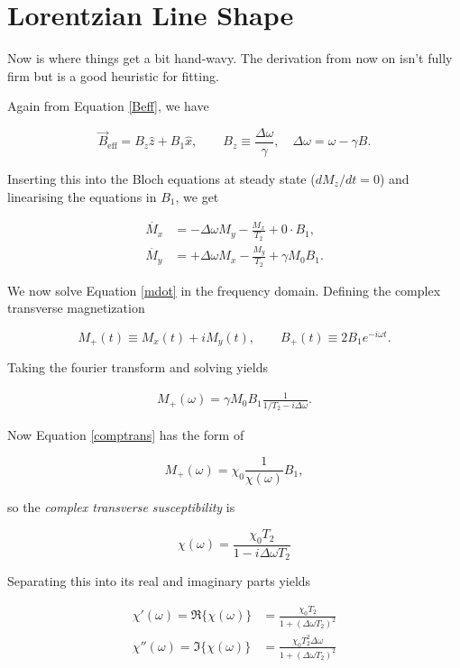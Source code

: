 \documentclass[svgnames]{article}
\begin{document}
\section{Lorentzian Line Shape}

Now is where things get a bit hand-wavy. The derivation from now on isn't fully
firm but is a good heuristic for fitting. 

Again from Equation \ref{Beff}, we have 

\[
    \vec{B}_\text{eff} = B_z \hat{z} + B_1 \hat{x}, \qquad B_z \equiv
    \frac{\Delta \omega}{\gamma}, \quad \Delta \omega = \omega - \gamma B.
\] \vspace{3px}

Inserting this into the Bloch equations at steady state ($d M_z / dt = 0$) and
linearising the equations in  $B_1$, we get 

\begin{align} \label{mdot}
    \dot{M_x} &= -\Delta \omega M_y - \frac{M_x}{T_2} + 0 \cdot B_1, \\ 
    \dot{M_y} &= +\Delta \omega M_x - \frac{M_y}{T_2} + \gamma M_0B_1. 
\end{align}\vspace{3px}


We now solve Equation \ref{mdot} in the frequency domain. Defining the complex
transverse magnetization 

\[
    M_+(t) \equiv M_x(t) + iM_y(t), \qquad B_+(t) \equiv 2B_1e^{-i\omega t}.
\] \vspace{3px}

Taking the fourier transform and solving yields 

\begin{align} \label{comptrans}
M_+(\omega) = \gamma M_0 B_1 \frac{1}{1/T_2 - i\Delta \omega}. 
\end{align} \vspace{3px}

Now Equation \ref{comptrans} has the form of 

\[
M_+(\omega) = \chi_0 \frac{1}{\chi(\omega)}B_1,
\] \vspace{3px}


so the \textit{complex transverse susceptibility} is 

\[
\chi(\omega) = \frac{\chi_0 T_2}{1 - i\Delta \omega T_2} 
\] \vspace{3px}

Separating this into its real and imaginary parts yields 

\begin{align} \label{reim}
    \chi'(\omega) = \Re\{\chi(\omega)\} &= \frac{\chi_0 T_2}{1 + (\Delta \omega T_2)^2} \\ 
    \chi''(\omega) = \Im\{\chi(\omega)\} &= \frac{\chi_0 T_2^2 \Delta \omega}{1+(\Delta \omega
    T_2)^2}
\end{align}\vspace{3px}
\end{document}
